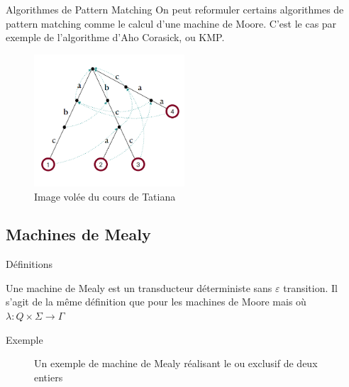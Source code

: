 \documentclass{beamer}
\begin{document}
\begin{frame}{Algorithmes de Pattern Matching}
    On peut reformuler certains algorithmes de pattern matching comme le calcul d'une machine de Moore.
    C'est le cas par exemple de l'algorithme d'Aho Corasick, ou KMP.

    \begin{figure}[h]
        \includegraphics[width = 0.5\textwidth]{Arbre Aho-Corasick.png}
        \\
        Image volée du cours de Tatiana
    \end{figure}
\end{frame}

\subsection{Machines de Mealy}

\begin{frame}{Définitions}
    \begin{definition}
        Une machine de Mealy est un transducteur déterministe sans $\varepsilon$ transition. Il s'agit de la même
        définition que pour les machines de Moore mais où $\lambda : Q \times \Sigma \rightarrow \Gamma$
    \end{definition}
\end{frame}

\begin{frame}{Exemple}
    \begin{figure}[h]
        \caption{Un exemple de machine de Mealy réalisant le ou exclusif de deux entiers}
            \begin{center}
        \end{center}
    \end{figure}
\end{frame}
\end{document}
